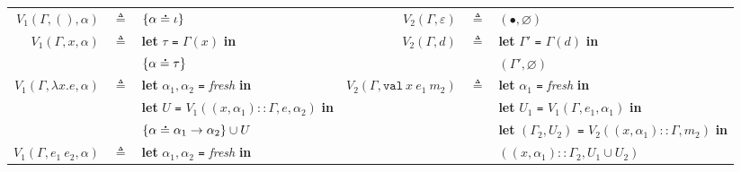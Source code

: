 \documentclass{article}
\theoremstyle{definition}
\newcommand*{\cons}{::}
\newcommand*{\A}[1]{\overset{\,_{\mbox{\Large .}}}{#1}}
\newcommand*{\modid}{d}
\newcommand*{\Lete}{\mathtt{val}}
\begin{document}
\begin{flushright}\end{flushright}
\hspace{-2.5em}
\begin{tabular}{rclrcl}
  $V_1(\Gamma,(),\alpha)$              & $\triangleq$ & $\{\alpha\A{=}\iota\}$                                                            & $V_2(\Gamma,\varepsilon)$             & $\triangleq$ & $(\bullet,\varnothing)$                                                                      \\
  $V_1(\Gamma,x,\alpha)$               & $\triangleq$ & \textbf{let} $\tau$ \texttt{=} $\Gamma(x)$ \textbf{in}                            & $V_2(\Gamma,\modid)$                  & $\triangleq$ & \textbf{let} $\Gamma'$ \texttt{=} $\Gamma(d)$ \textbf{in}                                    \\
                                       &              & $\{\alpha\A{=}\tau\}$                                                             &                                       &              & $(\Gamma',\varnothing)$                                                                      \\
  $V_1(\Gamma,\lambda x.e,\alpha)$     & $\triangleq$ & \textbf{let} $\alpha_1,\alpha_2$ \texttt{=} \textit{fresh} \textbf{in}            & $V_2(\Gamma,\Lete\:x\:e_1\:m_2)$      & $\triangleq$ & \textbf{let} $\alpha_1$ \texttt{=} \textit{fresh} \textbf{in}                                \\
                                       &              & \textbf{let} $U$ \texttt{=} $V_1((x,\alpha_1)\cons\Gamma,e,\alpha_2)$ \textbf{in} &                                       &              & \textbf{let} $U_1$ \texttt{=} $V_1(\Gamma,e_1,\alpha_1)$ \textbf{in}                         \\
                                       &              & $\{\alpha\A{=}\alpha_1\rightarrow\alpha_2\}\cup U$                                &                                       &              & \textbf{let} $(\Gamma_2,U_2)$ \texttt{=} $V_2((x,\alpha_1)\cons\Gamma,m_2)$ \textbf{in}      \\
  $V_1(\Gamma,e_1\:e_2,\alpha)$        & $\triangleq$ & \textbf{let} $\alpha_1,\alpha_2$ \texttt{=} \textit{fresh} \textbf{in}            &                                       &              & $((x,\alpha_1)\cons\Gamma_2,U_1\cup U_2)$                                                    \\

\end{tabular}
\end{document}
